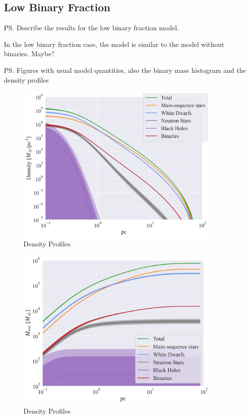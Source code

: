 \subsection{Low Binary Fraction}
\ps{Describe the results for the low binary fraction model.}

In the low binary fraction case, the model is similar to the model without binaries. Maybe?

\ps{Figures with usual model quantities, also the binary mass histogram and the density profiles}


\begin{figure}
	\begin{center}
\includegraphics[width=0.9\textwidth]{figures/low_bin_model/density.png}
	\end{center}
\caption{Density Profiles}
	\label{fig:low_bin_model_densities}
\end{figure}

\begin{figure}
	\begin{center}
		\includegraphics[width=0.9\textwidth]{figures/low_bin_model/mass_enc.png}
	\end{center}
	\caption{Density Profiles}
	\label{fig:low_bin_model_enclosed_mass}
\end{figure}

